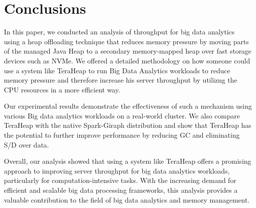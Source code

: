 \section{Conclusions}

In this paper, we conducted an analysis of throughput for big data analytics
using a heap offloading technique that reduces memory pressure by moving parts of
the managed Java Heap to a secondary memory-mapped heap over fast
storage devices such as NVMe. We offered a detailed methodology on
how someone could use a system like TeraHeap to run Big Data Analytics workloads
to reduce memory pressure and therefore increase his server throughput by utilizng the CPU resources
in a more efficient way.

Our experimental results demonstrate the effectiveness of such a mechanism
using various Big data analytics workloads on a real-world cluster. We also
compare TeraHeap with the native Spark-Giraph distribution and show
that TeraHeap has the potential to further improve performance by reducing GC and eliminating S/D over data.

Overall, our analysis showed that using a system like TeraHeap offers a promising approach to
improving server throughput for big data analytics workloads, particularly for computation-intensive tasks. With the
increasing demand for efficient and scalable big data processing frameworks, this analysis provides a valuable contribution to the field
of big data analytics and memory management.
